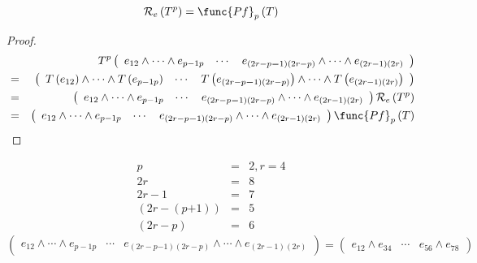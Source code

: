 \documentclass[aps,prd,onecolumn,notitlepage,nofootinbib]{revtex4-2}
\begin{document}
\begin{theorem}
\begin{equation}
\mathcal{R}_{e}\left( T^{p}\right) =\func{Pf}_{p}\left( T\right) 
\end{equation}
\end{theorem}

\begin{proof}
\begin{eqnarray}
&&T^{p}\left( 
\begin{array}{ccc}
e_{12}\wedge \cdots \wedge e_{p-1p} & \cdots  & e_{\left( 2r-p\boldsymbol{-}%
1\right) \left( 2r-p\right) }\wedge \cdots \wedge e_{\left( 2r-1\right)
\left( 2r\right) }%
\end{array}%
\right)  \\
&=&\left( 
\begin{array}{ccc}
T\left( e_{12}\right) \wedge \cdots \wedge T\left( e_{p-1p}\right)  & \cdots 
& T\left( e_{\left( 2r-p\boldsymbol{-}1\right) \left( 2r-p\right) }\right)
\wedge \cdots \wedge T\left( e_{\left( 2r-1\right) \left( 2r\right) }\right) 
\end{array}%
\right)  \\
&=&\left( 
\begin{array}{ccc}
e_{12}\wedge \cdots \wedge e_{p-1p} & \cdots  & e_{\left( 2r-p\boldsymbol{-}%
1\right) \left( 2r-p\right) }\wedge \cdots \wedge e_{\left( 2r-1\right)
\left( 2r\right) }%
\end{array}%
\right) \mathcal{R}_{e}\left( T^{p}\right)  \\
&=&\left( 
\begin{array}{ccc}
e_{12}\wedge \cdots \wedge e_{p-1p} & \cdots  & e_{\left( 2r-p\boldsymbol{-}%
1\right) \left( 2r-p\right) }\wedge \cdots \wedge e_{\left( 2r-1\right)
\left( 2r\right) }%
\end{array}%
\right) \func{Pf}_{p}\left( T\right) 
\end{eqnarray}
\end{proof}

\begin{example}
\begin{eqnarray}
p &=&2,r=4 \\
2r &=&8 \\
2r-1 &=&7 \\
\left( 2r-\left( p\boldsymbol{+}1\right) \right)  &=&5 \\
\left( 2r-p\right)  &=&6
\end{eqnarray}%
\begin{equation}
\left( 
\begin{array}{ccc}
e_{12}\wedge \cdots \wedge e_{p-1p} & \cdots  & e_{\left( 2r-p\boldsymbol{-}%
1\right) \left( 2r-p\right) }\wedge \cdots \wedge e_{\left( 2r-1\right)
\left( 2r\right) }%
\end{array}%
\right) =\left( 
\begin{array}{ccc}
e_{12}\wedge e_{34} & \cdots  & e_{56}\wedge e_{78}%
\end{array}%
\right) 
\end{equation}
\end{example}
\end{document}
